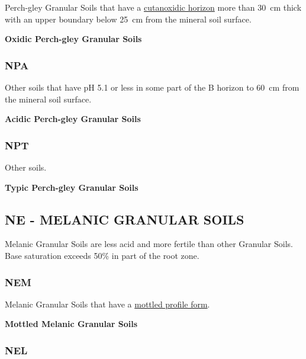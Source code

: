 \documentclass[
  letterpaper,
  DIV=11,
  numbers=noendperiod]{scrreprt}
\begin{document}
Perch-gley Granular Soils that have a
\protect\hyperlink{sec-diag-cutoxh}{cutanoxidic horizon} more than 30~cm
thick with an upper boundary below 25~cm from the mineral soil surface.

\textbf{Oxidic Perch-gley Granular Soils}

\hypertarget{sec-key-NPA}{%
\subsubsection{\texorpdfstring{\textbf{NPA}}{NPA}}\label{sec-key-NPA}}

Other soils that have pH 5.1 or less in some part of the B horizon to
60~cm from the mineral soil surface.

\textbf{Acidic Perch-gley Granular Soils}

\hypertarget{sec-key-NPT}{%
\subsubsection{\texorpdfstring{\textbf{NPT}}{NPT}}\label{sec-key-NPT}}

Other soils.

\textbf{Typic Perch-gley Granular Soils}

\hypertarget{sec-NE}{%
\subsection{\texorpdfstring{\textbf{NE} - MELANIC GRANULAR
SOILS}{NE - MELANIC GRANULAR SOILS}}\label{sec-NE}}

Melanic Granular Soils are less acid and more fertile than other
Granular Soils. Base saturation exceeds 50\% in part of the root zone.

\hypertarget{sec-key-NEM}{%
\subsubsection{\texorpdfstring{\textbf{NEM}}{NEM}}\label{sec-key-NEM}}

Melanic Granular Soils that have a
\protect\hyperlink{sec-diag-mottpf}{mottled profile form}.

\textbf{Mottled Melanic Granular Soils}

\hypertarget{sec-key-NEL}{%
\subsubsection{\texorpdfstring{\textbf{NEL}}{NEL}}\label{sec-key-NEL}}
\end{document}

